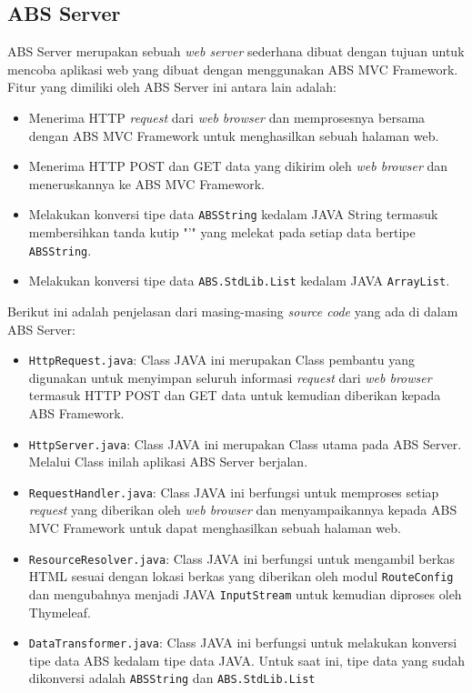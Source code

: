 \subsection{ABS Server}

ABS Server merupakan sebuah \textit{web server} sederhana dibuat dengan tujuan untuk mencoba aplikasi web yang dibuat dengan menggunakan ABS MVC Framework. Fitur yang dimiliki oleh ABS Server ini antara lain adalah:

\begin{itemize}
    \item Menerima HTTP \textit{request} dari \textit{web browser} dan memprosesnya bersama dengan ABS MVC Framework untuk menghasilkan sebuah halaman web.
    \item Menerima HTTP POST dan GET data yang dikirim oleh \textit{web browser} dan meneruskannya ke ABS MVC Framework.
    \item Melakukan konversi tipe data \texttt{ABSString} kedalam JAVA String termasuk membersihkan tanda kutip "'" yang melekat pada setiap data bertipe \texttt{ABSString}.
    \item Melakukan konversi tipe data \texttt{ABS.StdLib.List} kedalam JAVA \texttt{ArrayList}.
\end{itemize}

Berikut ini adalah penjelasan dari masing-masing \textit{source code} yang ada di dalam ABS Server:

\begin{itemize}
    \item \texttt{HttpRequest.java}: Class JAVA ini merupakan Class pembantu yang digunakan untuk menyimpan seluruh informasi \textit{request} dari \textit{web browser} termasuk HTTP POST dan GET data untuk kemudian diberikan kepada ABS Framework.
    \item \texttt{HttpServer.java}: Class JAVA ini merupakan Class utama pada ABS Server. Melalui Class inilah aplikasi ABS Server berjalan.
    \item \texttt{RequestHandler.java}: Class JAVA ini berfungsi untuk memproses setiap \textit{request} yang diberikan oleh \textit{web browser} dan menyampaikannya kepada ABS MVC Framework untuk dapat menghasilkan sebuah halaman web.
    \item \texttt{ResourceResolver.java}: Class JAVA ini berfungsi untuk mengambil berkas HTML sesuai dengan lokasi berkas yang diberikan oleh modul \texttt{RouteConfig} dan mengubahnya menjadi JAVA \texttt{InputStream} untuk kemudian diproses oleh Thymeleaf.
    \item \texttt{DataTransformer.java}: Class JAVA ini berfungsi untuk melakukan konversi tipe data ABS kedalam tipe data JAVA. Untuk saat ini, tipe data yang sudah dikonversi adalah \texttt{ABSString} dan \texttt{ABS.StdLib.List}
\end{itemize}

